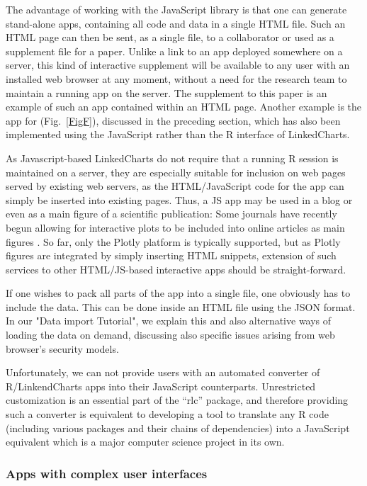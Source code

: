 \documentclass[twocolumn,10pt]{article}
\begin{document}
The advantage of working with the JavaScript library is that one can generate stand-alone apps, containing all code and data in a single HTML file. Such an HTML page can then be sent, as a single file, to a collaborator or used as a supplement file for a paper. Unlike a link to an app deployed somewhere on a server, this kind of interactive supplement will be available to any user with an installed web browser at any moment, without a need for the research team to maintain a running app on the server. The supplement to this paper is an example of such an app contained within an HTML page. Another example is the app for \citet{wang_2020} (Fig.\ \ref{FigF}), discussed in the preceding section, which has also been implemented using the JavaScript rather than the R interface of LinkedCharts. 

As Javascript-based LinkedCharts do not require that a running R session is maintained on a server, they are especially suitable for inclusion on web pages served by existing web servers, as the HTML/JavaScript code for the app can simply be inserted into existing pages. Thus, a JS app may be used in a blog or even as a main figure of a scientific publication: Some journals have recently begun allowing for interactive plots to be included into online articles as main figures \citep{ingraham_2017}. So far, only the Plotly platform is typically supported, but as Plotly figures are integrated by simply inserting HTML snippets, extension of such services to other HTML/JS-based interactive apps should be straight-forward.

If one wishes to pack all parts of the app into a single file, one obviously has to include the data. This can be done inside an HTML file using the JSON format. In our "Data import Tutorial", we explain this and also alternative ways of loading the data on demand, discussing also specific issues arising from web browser's security models.

Unfortunately, we can not provide users with an automated converter of R/LinkendCharts apps into their JavaScript counterparts. Unrestricted customization is an essential part of the ``rlc'' package, and therefore providing such a converter is equivalent to developing a tool to translate any R code (including various packages and their chains of dependencies) into a JavaScript equivalent which is a major computer science project in its own.

\subsubsection{Apps with complex user interfaces}\label{gui_apps}
\end{document}
